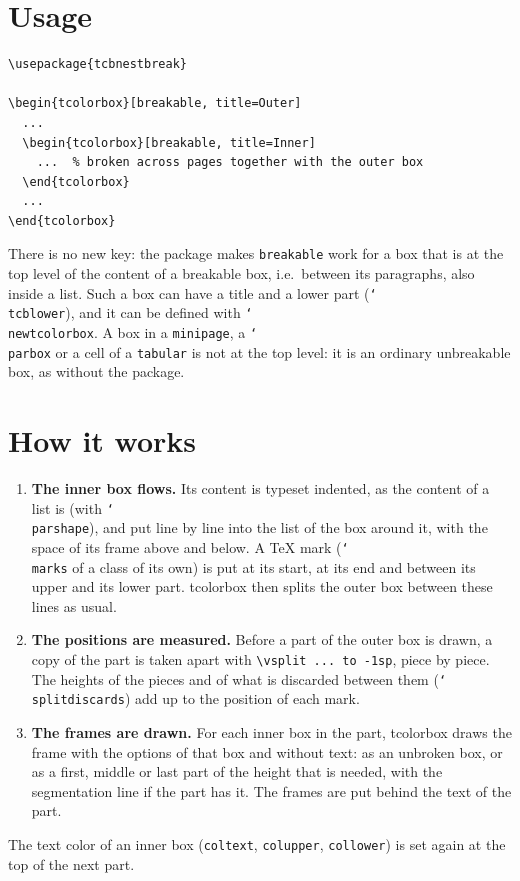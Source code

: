 \documentclass{article}
\newcommand*\cs[1]{\texttt{\char`\\#1}}
\newcommand*\pkg[1]{\textsf{#1}}
\newcommand*\key[1]{\texttt{#1}}
\begin{document}
\section{Usage}

\begin{verbatim}
\usepackage{tcbnestbreak}

\begin{tcolorbox}[breakable, title=Outer]
  ...
  \begin{tcolorbox}[breakable, title=Inner]
    ...  % broken across pages together with the outer box
  \end{tcolorbox}
  ...
\end{tcolorbox}
\end{verbatim}

\noindent
There is no new key: the package makes \key{breakable} work for a box
that is at the top level of the content of a breakable box, i.e.\
between its paragraphs, also inside a list.  Such a box can have a
title and a lower part (\cs{tcblower}), and it can be defined with
\cs{newtcolorbox}.  A box in a \texttt{minipage}, a \cs{parbox} or a
cell of a \texttt{tabular} is not at the top level: it is an ordinary
unbreakable box, as without the package.

\section{How it works}

\begin{enumerate}
\item \textbf{The inner box flows.}  Its content is typeset indented,
  as the content of a list is (with \cs{parshape}), and put line by
  line into the list of the box around it, with the space of its frame
  above and below.  A \TeX{} mark
  (\cs{marks} of a class of its own) is put at its start, at its end
  and between its upper and its lower part.  \pkg{tcolorbox} then
  splits the outer box between these lines as usual.
\item \textbf{The positions are measured.}  Before a part of the outer
  box is drawn, a copy of the part is taken apart with
  \verb|\vsplit ... to -1sp|, piece by piece.  The heights of the
  pieces and of what is discarded between them (\cs{splitdiscards})
  add up to the position of each mark.
\item \textbf{The frames are drawn.}  For each inner box in the part,
  \pkg{tcolorbox} draws the frame with the options of that box and
  without text: as an unbroken box, or as a first, middle or last part
  of the height that is needed, with the segmentation line if the part
  has it.  The frames are put behind the text of the part.
\end{enumerate}
The text color of an inner box (\key{coltext}, \key{colupper},
\key{collower}) is set again at the top of the next part.
\end{document}
